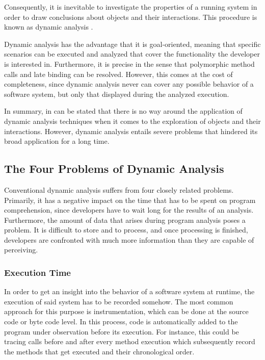 Consequently, it is inevitable to investigate the properties of a running system in order to draw conclusions about objects and their interactions.
This procedure is known as dynamic analysis \cite{bell_concept_1999}.

Dynamic analysis has the advantage that it is goal-oriented, meaning that specific scenarios can be executed and analyzed that cover the functionality the developer is interested in.
Furthermore, it is precise in the sense that polymorphic method calls and late binding can be resolved.
However, this comes at the cost of completeness, since dynamic analysis never can cover any possible behavior of a software system, but only that displayed during the analyzed execution.

In summary, in can be stated that there is no way around the application of dynamic analysis techniques when it comes to the exploration of objects and their interactions.
However, dynamic analysis entails severe problems that hindered its broad application for a long time.

\subsection{The Four Problems of Dynamic Analysis}

Conventional dynamic analysis suffers from four closely related problems.
Primarily, it has a negative impact on the time that has to be spent on program comprehension, since developers have to wait long for the results of an analysis.
Furthermore, the amount of data that arises during program analysis poses a problem. 
It is difficult to store and to process, and once processing is finished, developers are confronted with much more information than they are capable of perceiving.

\subsubsection{Execution Time}
In order to get an insight into the behavior of a software system at runtime, the execution of said system has to be recorded somehow.
The most common approach for this purpose is instrumentation, which can be done at the source code or byte code level.
In this process, code is automatically added to the program under observation before its execution.
For instance, this could be tracing calls before and after every method execution which subsequently record the methods that get executed and their chronological order.

